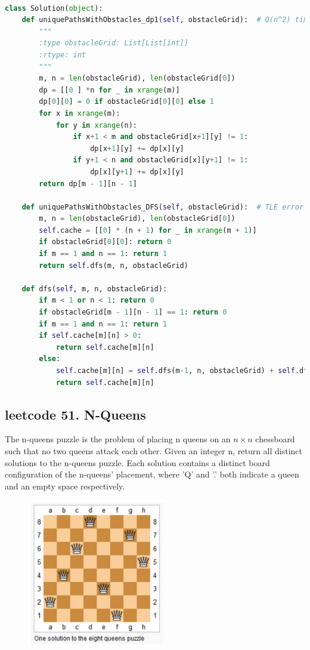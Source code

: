 \documentclass[a4paper,10pt]{article}
\begin{document}
\begin{lstlisting}[language=Python, caption=Problem63. Unique Paths II]

class Solution(object):
    def uniquePathsWithObstacles_dp1(self, obstacleGrid):  # O(n^2) time, O(n^2) space
        """
        :type obstacleGrid: List[List[int]]
        :rtype: int
        """
        m, n = len(obstacleGrid), len(obstacleGrid[0])
        dp = [[0 ] *n for _ in xrange(m)]
        dp[0][0] = 0 if obstacleGrid[0][0] else 1
        for x in xrange(m):
            for y in xrange(n):
                if x+1 < m and obstacleGrid[x+1][y] != 1:
                    dp[x+1][y] += dp[x][y]
                if y+1 < n and obstacleGrid[x][y+1] != 1:
                    dp[x][y+1] += dp[x][y]
        return dp[m - 1][n - 1]

    def uniquePathsWithObstacles_DFS(self, obstacleGrid):  # TLE error
        m, n = len(obstacleGrid), len(obstacleGrid[0])
        self.cache = [[0] * (n + 1) for _ in xrange(m + 1)]
        if obstacleGrid[0][0]: return 0
        if m == 1 and n == 1: return 1
        return self.dfs(m, n, obstacleGrid)

    def dfs(self, m, n, obstacleGrid):
        if m < 1 or n < 1: return 0
        if obstacleGrid[m - 1][n - 1] == 1: return 0
        if m == 1 and n == 1: return 1
        if self.cache[m][n] > 0:
            return self.cache[m][n]
        else:
            self.cache[m][n] = self.dfs(m-1, n, obstacleGrid) + self.dfs(m, n-1, obstacleGrid)
            return self.cache[m][n]
\end{lstlisting}



\subsection{leetcode 51. N-Queens}
The n-queens puzzle is the problem of placing n queens on an $n \times n$ chessboard such that no two queens attack each other. Given an integer n, return all distinct solutions to the n-queens puzzle. Each solution contains a distinct board configuration of the n-queens' placement, where 'Q' and '.' both indicate a queen and an empty space respectively.

\begin{figure}[h]
    \includegraphics[width=6cm]{leetcode51.jpg}
    \centering\\
\end{figure}
\end{document}
